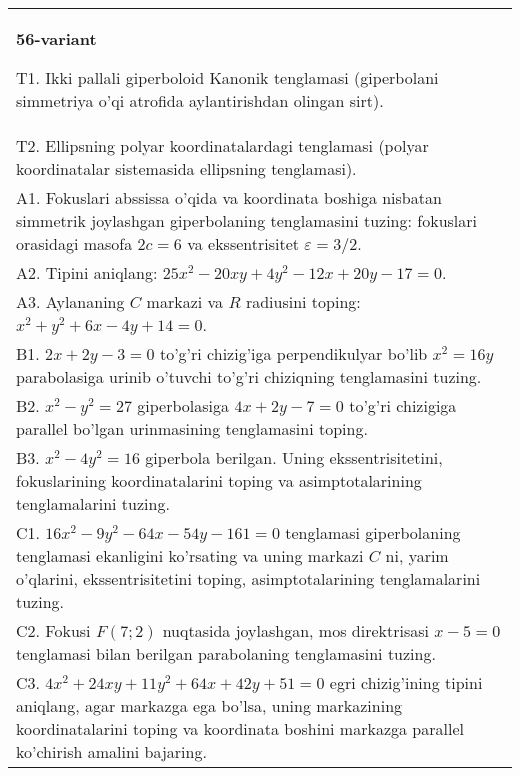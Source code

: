 \documentclass{article}
\begin{document}
\begin{tabular}{m{17cm}}
\textbf{56-variant}
\newline

T1. Ikki pallali giperboloid Kanonik tenglamasi (giperbolani simmetriya o'qi atrofida aylantirishdan olingan sirt).\\

T2. Ellipsning polyar koordinatalardagi tenglamasi (polyar koordinatalar sistemasida ellipsning tenglamasi).\\

A1. Fokuslari abssissa o'qida va koordinata boshiga nisbatan simmetrik joylashgan giperbolaning tenglamasini tuzing: fokuslari orasidagi masofa $2c=6$ va ekssentrisitet $\varepsilon=3/2$.\\

A2. Tipini aniqlang: $25x^{2}-20xy+4y^{2}-12x+20y-17=0$.\\

A3. Aylananing $C$ markazi va $R$ radiusini toping: $x^2+y^2+6x-4y+14=0$.\\

B1. $2x + 2y - 3 = 0$ to'g'ri chizig'iga perpendikulyar bo'lib $x^{2} = 16y$ parabolasiga urinib o'tuvchi to'g'ri chiziqning tenglamasini tuzing.  \\

B2. $x^{2} - y^{2} = 27$ giperbolasiga $4x + 2y - 7 = 0$ to'g'ri chizigiga parallel bo'lgan urinmasining tenglamasini toping.  \\

B3. $x^{2} - 4y^{2} = 16$ giperbola berilgan. Uning ekssentrisitetini, fokuslarining koordinatalarini toping va asimptotalarining tenglamalarini tuzing.\\

C1. $16x^{2} - 9y^{2} - 64x - 54y - 161 = 0$ tenglamasi giperbolaning tenglamasi ekanligini ko'rsating va uning markazi $C$ ni, yarim o'qlarini, ekssentrisitetini toping, asimptotalarining tenglamalarini tuzing.  \\

C2. Fokusi $F(7;2)$ nuqtasida joylashgan, mos direktrisasi $x - 5 = 0$ tenglamasi bilan berilgan parabolaning tenglamasini tuzing.  \\

C3. $4x^{2} + 24xy + 11y^{2} + 64x + 42y + 51 = 0$ egri chizig'ining tipini aniqlang, agar markazga ega bo'lsa, uning markazining koordinatalarini toping va koordinata boshini markazga parallel ko'chirish amalini bajaring.\\

\end{tabular}
\vspace{1cm}
\end{document}
